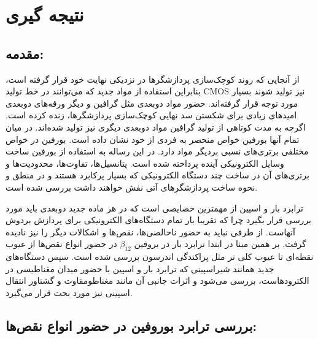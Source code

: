 \chapter{نتیجه گیری}

\clearpage
\section{مقدمه:}
از آنجایی که روند کوچک‌سازی پردازشگرها در نزدیکی نهایت خود قرار گرفته است، بنابراین استفاده از مواد جدید که می‌توانند در خط تولید \gls{CMOS} نیز تولید شوند بسیار مورد توجه قرار گرفته‌اند. 
حضور مواد دوبعدی مثل گرافین و دیگر ورقه‌های دوبعدی امیدهای زیادی برای شکستن سد نهایی کوچک‌سازی پردازشگرها، زنده کرده است. 
اگرچه به مدت کوتاهی از تولید گرافین مواد دوبعدی دیگری نیز تولید شده‌اند. در میان تمام آنها بورفین خواص منحصر به فردی از خود نشان داده است. بورفین در خواص مختلفی برتری‌های نسبی بردیگر مواد دارد.
در این رساله به استفاده از بورفین ساخت وسایل الکترونیکی آینده پرداخته شده است. 
پتانسیل‌ها، تفاوت‌ها، محدودیت‌ها و برتری‌های آن در ساخت چند دستگاه الکترونیکی که بسیار پرکابرد هستند و در منطق و نحوه ساخت پردازشگرهای آتی نفش خواهند داشت بررسی شده است.

ترابرد بار و اسپین از مهمترین خصایصی است که در هر ماده جدید دوبعدی باید مورد بررسی قرار بگیرد چرا که تقریبا بار تمام دستگاه‌های الکترونیکی برای پردازش بردوش آنهاست.
از طرفی نباید به حضور ناحالصی‌ها، نقص‌ها و اشکالات دیگر را نیز نادیده گرفت. بر همین مبنا در ابتدا ترابرد بار در بروفین $\beta_{12}$ در حضور انواع نقص‌ها از عیوب نقطه‌ای تا عیوب کلی تر مثل پراکندگی اندرسون بررسی شده است. سپس دستگاه‌های جدید همانند شیر‌اسپینی که ترابرد بار و اسپین با حضور میدان مغناطیسی در الکترودهاست، بررسی می‌شود و اثرات جانبی آن مانند مغناطومقاوت و گشتاور انتقال اسپینی نیز مورد بحث قرار می‌گیرد.
\section{بررسی ترابرد بوروفین در حضور انواع نقص‌ها:}

